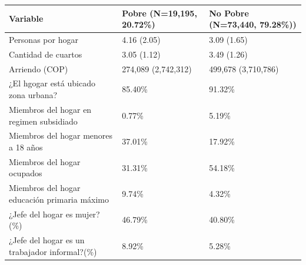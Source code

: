 \begin{tabular}{lll}
\toprule
Variable & Pobre
(N=19,195, 20.72\%) & No Pobre
(N=73,440, 79.28\%)) \\
\midrule
Personas por hogar & 4.16 (2.05) & 3.09 (1.65) \\
Cantidad de cuartos & 3.05 (1.12) & 3.49 (1.26) \\
Arriendo (COP) & 274,089 (2,742,312) & 499,678 (3,710,786) \\
¿El hgogar está ubicado zona urbana? & 85.40\% & 91.32\% \\
Miembros del hogar en regimen subsidiado & 0.77\% & 5.19\% \\
Miembros del hogar menores a 18 años & 37.01\% & 17.92\% \\
Miembros del hogar ocupados & 31.31\% & 54.18\% \\
Miembros del hogar educación primaria máximo & 9.74\% & 4.32\% \\
¿Jefe del hogar es mujer? (\%) & 46.79\% & 40.80\% \\
¿Jefe del hogar es un trabajador informal?(\%) & 8.92\% & 5.28\% \\
\bottomrule
\end{tabular}
